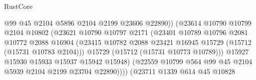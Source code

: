 \begin{lexlean}{RustCore}
\begin{coremodule}
                                        @99
                                        @45
                                        @2104
                                        @5896
                                        @2104
                                        @2199
                                        @23606
                                        @22890))
                                    (@23614
                                      @10790
                                      @10799
                                      @2104
                                      @10802
                                      (@23621
                                        @10790
                                        @10797
                                        @2171
                                        (@23401
                                          @10789
                                          @10796
                                          @2081
                                          @10772
                                          @2088
                                          @16904
                                          (@23415
                                            @10782
                                            @2088
                                            @23421
                                            @16945
                                            @15729
                                            (@15712 (@15731 @10783 @2104)))
                                          @15729
                                          (@15712 (@15731 @10773 @10789)))
                                        @15927
                                        @15930
                                        @15933
                                        @15937
                                        @15942
                                        @15948)
                                      (@22559
                                        @10799
                                        @564
                                        @99
                                        @45
                                        @2104
                                        @5939
                                        @2104
                                        @2199
                                        @23704
                                        @22890))))
                                (@23711
                                  @1339
                                  @614
                                  @45
                                  @10828

\end{coremodule}
\end{lexlean}

